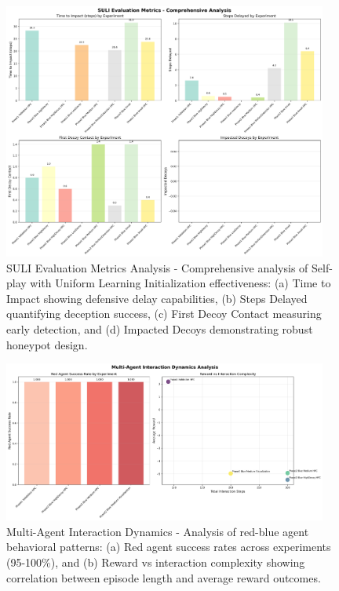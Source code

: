 \documentclass[11pt]{article}
\theoremstyle{definition}
\theoremstyle{plain}
\begin{document}
\begin{figure}[H]
\centering
\includegraphics[width=0.95\textwidth]{../SULI_EVALUATION_COMPREHENSIVE_ANALYSIS.png}
\caption{SULI Evaluation Metrics Analysis - Comprehensive analysis of Self-play with Uniform Learning Initialization effectiveness: (a) Time to Impact showing defensive delay capabilities, (b) Steps Delayed quantifying deception success, (c) First Decoy Contact measuring early detection, and (d) Impacted Decoys demonstrating robust honeypot design.}
\label{fig:suli_evaluation}
\end{figure}

\begin{figure}[H]
\centering
\includegraphics[width=0.95\textwidth]{../MULTI_AGENT_INTERACTION_DYNAMICS.png}
\caption{Multi-Agent Interaction Dynamics - Analysis of red-blue agent behavioral patterns: (a) Red agent success rates across experiments (95-100\%), and (b) Reward vs interaction complexity showing correlation between episode length and average reward outcomes.}
\label{fig:interaction_dynamics}
\end{figure}
\end{document}
